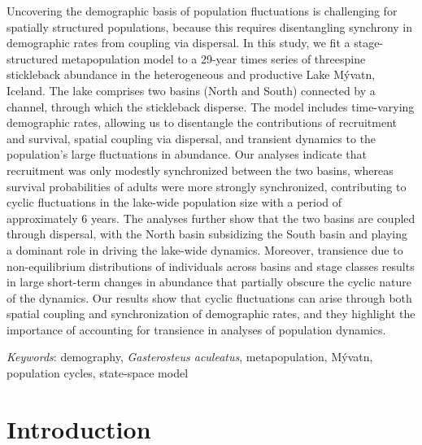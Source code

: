 \documentclass[11pt]{article}
\begin{document}
Uncovering the demographic basis of population fluctuations is challenging 
for spatially structured populations, 
because this requires disentangling synchrony in demographic rates 
from coupling via dispersal. 
In this study, we fit a stage-structured metapopulation model to a 29-year times series 
of threespine stickleback abundance in the heterogeneous 
and productive Lake M\'{y}vatn, Iceland. 
The lake comprises two basins (North and South) connected by a channel, 
through which the stickleback disperse. 
The model includes time-varying demographic rates, 
allowing us to disentangle the contributions of recruitment and survival, 
spatial coupling via dispersal, and transient dynamics 
to the population’s large fluctuations in abundance. 
Our analyses indicate that recruitment was only modestly synchronized between the two basins, 
whereas survival probabilities of adults were more strongly synchronized, 
contributing to cyclic fluctuations in the lake-wide population size 
with a period of approximately 6 years. 
The analyses further show that the two basins are coupled through dispersal, 
with the North basin subsidizing the South basin and playing a dominant role 
in driving the lake-wide dynamics. 
Moreover, transience due to non-equilibrium distributions of individuals 
across basins and stage classes results in large short-term changes in abundance 
that partially obscure the cyclic nature of the dynamics. 
Our results show that cyclic fluctuations can arise through both spatial coupling 
and synchronization of demographic rates, and they highlight the importance 
of accounting for transience in analyses of population dynamics.


\bigskip

\textit{Keywords}: {demography, \textit{Gasterosteus aculeatus}, metapopulation,
                    M\'{y}vatn, population cycles, state-space model}

\clearpage




\section*{Introduction} \label{introduction}
\end{document}
